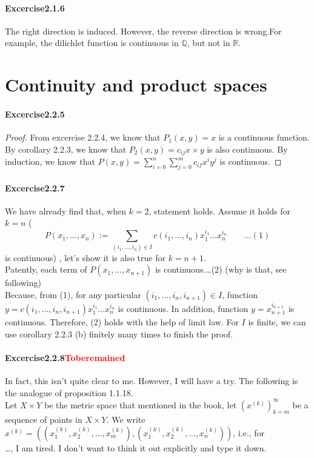 \paragraph{Excercise2.1.6}
The right direction is induced. However, the reverse direction is wrong.For example, the dilichlet function is continuous in $\mathbb{Q}$, but not in $\mathbb{R}$.
\section{Continuity and product spaces}
\paragraph{Excercise2.2.5}
\begin{proof}
From excercise 2.2.4, we know that $P_{1}(x,y)=x$ is a continuous function. By corollary 2.2.3, we know that $P_{2}(x,y)=c_{ij}x\times y$ is also continuous. By induction, we know that $P(x,y)=\sum_{i=0}^{n}\sum_{j=0}^{m}c_{if}x^{i}y^{j}$ is continuous.
\end{proof}
\paragraph{Excercise2.2.7} We have already
find that, when $k=2$, statement holds. Assume it holds for $k=n$ (\[P(x_{1},\dots,x_{n}):=\sum_{(i_{1},\dots,i_{n})\in I}c(i_{1},\dots,i_{n})x_{1}^{i_{1}}\dots x_{n}^{i_{n}}\qquad\dots(1)\] is continuous) , let's show it is also true for $k=n+1$.\\ Patently, each term of $P(x_{1},\dots,x_{n+1})$ is continuous.\dots (2) (why is that, see following)\\
Because, from (1), for any particular $(i_{1},\dots,i_{n},i_{n+1})\in I$, function $y=c(i_{1},\dots,i_{n},i_{n+1})x_{1}^{i_{1}}\dots x_{n}^{i_{n}}$ is continuous. In addition, function $y=x_{n+1}^{i_{n+1}}$ is continuous. Therefore, (2) holds with the help of limit law. For $I$ is finite, we can use corollary 2.2.3 (b) finitely many times to finish the proof.
\paragraph{Excercise2.2.8\textcolor{red}{Toberemained}} In fact, this isn't quite clear to me. However, I will have a try. The following is the analogue of proposition 1.1.18.\\
Let $X\times Y$ be the metric space that mentioned in the book, let $(x^{(k)})_{k=m}^{\infty}$ be a sequence of points in $X\times Y$. We write $x^{(k)}
=((x_{1}^{(k)},x_{2}^{(k)},\dots,x_{m}^{(k)}),(x_{1}^{(k)},x_{2}^{(k)},\dots,x_{n}^{(k)}))$, i.e., for \\
\dots, I am tired. I don't want to think it out explicitly and type it down.

